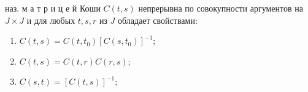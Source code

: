 \documentclass[10pt]{article}
\begin{document}
наз. м а т р и ц е й Коши $C(t, s)$ непрерывна по совокупности аргументов на $J \times J$ и для любых $t, s, r$ из $J$ обладает свойствами:



\begin{enumerate}

  \item $C(t, s)=C\left(t, t_{0}\right)\left[C\left(s, t_{0}\right)\right]^{-1}$;



  \item $C(t, s)=C(t, r) C(r, s)$;



  \item $C(s, t)=[C(t, s)]^{-1}$;



\end{enumerate}
\end{document}
